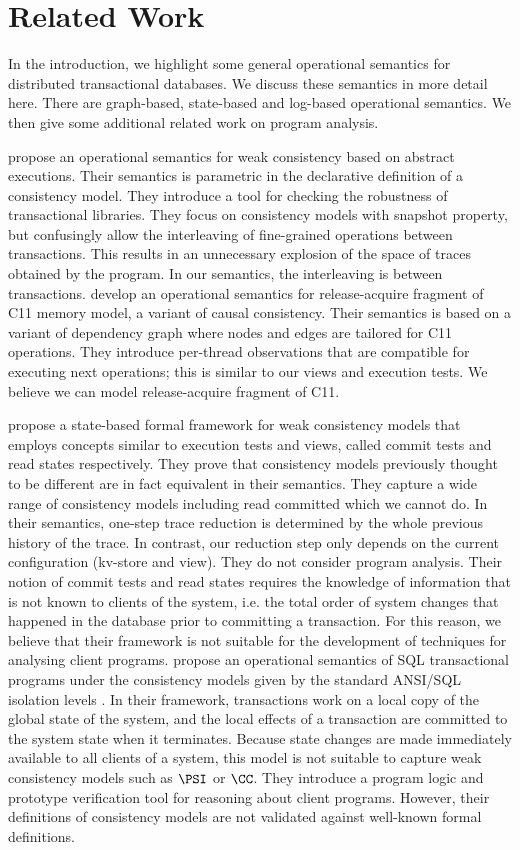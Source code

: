 \section{Related Work}
\label{sec:related-work}
In the introduction, we highlight some general operational semantics for 
distributed transactional databases.
We discuss these semantics in more detail here.
There are graph-based, state-based and log-based operational semantics.
We then give some additional related work on program analysis. 

\citet{sureshConcur} propose an operational semantics for weak consistency based on abstract executions. 
Their semantics is parametric in the declarative definition of a consistency model. 
They introduce a tool for checking the robustness of transactional  libraries.
They focus on consistency models with snapshot property, but confusingly allow 
the interleaving of fine-grained operations between transactions. 
This results in an unnecessary explosion of the space of traces obtained by 
the program. In our semantics, the interleaving is between transactions.
\citet{op-semantics-c11-rar} develop an operational semantics for release-acquire fragment of
C11 memory model, a variant of causal consistency.
Their semantics is based on a variant of dependency graph where nodes and edges 
are tailored for C11 operations.
They introduce per-thread observations that are compatible for executing next operations;
this is similar to our views and execution tests.
We believe we can model release-acquire fragment of C11.

\citet{seebelieve} propose a state-based formal framework for weak consistency models 
that employs concepts  similar to execution tests and views, called commit tests and read states respectively.
They prove that consistency models previously thought to be different are in fact equivalent in their semantics. 
They capture a wide range of consistency models including read committed which we cannot do. 
In their semantics, one-step trace reduction is determined by the whole previous history of the trace. 
In contrast, our reduction step only depends on the current configuration (kv-store and view).
They do not consider program analysis. Their notion of commit tests and read states requires 
the knowledge of information that is not known to clients of the system, i.e. the total order of system changes that happened in the database 
prior to committing a transaction. For this reason, we believe that
their framework is not suitable for the development of techniques for analysing client programs. 
\citet{alonetogether} propose an operational semantics of SQL transactional programs 
under the consistency models given by the standard ANSI/SQL isolation levels \cite{si}.
In their  framework, transactions work on a local copy of the global state 
of the system, and the local effects of a transaction are committed to the  
system state when it terminates. Because state changes 
are made immediately available to all clients of a system, this model 
is not suitable to capture weak consistency models such as \(\PSI\) or \(\CC\). 
They introduce a program logic and prototype verification tool for reasoning 
about client programs. However, their definitions of consistency models 
are not validated against well-known formal definitions.

